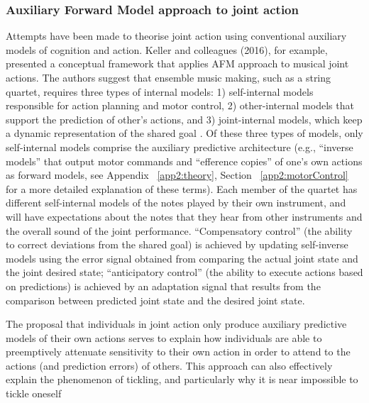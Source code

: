 \begin{CJK}{UTF8}{gbsn}
\subsubsection{Auxiliary Forward Model approach to joint action}
Attempts have been made to theorise joint action using conventional auxiliary models of cognition and action.  Keller and colleagues (2016), for example, presented a conceptual framework that applies AFM approach to musical joint actions.  The authors suggest that ensemble music making, such as a string quartet, requires three types of internal models: 1) self-internal models responsible for action planning and motor control, 2) other-internal models that support the prediction of other’s actions, and 3) joint-internal models, which keep a dynamic representation of the shared goal \citep{Keller2016}.  Of these three types of models, only self-internal models comprise the auxiliary predictive architecture (e.g., ``inverse models'' that output motor commands and ``efference copies'' of one’s own actions as forward models, see Appendix ~\ref{app2:theory}, Section ~\ref{app2:motorControl} for a more detailed explanation of these terms).  Each member of the quartet has different self-internal models of the notes played by their own instrument, and will have expectations about the notes that they hear from other instruments and the overall sound of the joint performance.  ``Compensatory control'' (the ability to correct deviations from the shared goal) is achieved by updating self-inverse models using the error signal obtained from comparing the actual joint state and the joint desired state; ``anticipatory control'' (the ability to execute actions based on predictions) is achieved by an adaptation signal that results from the comparison between predicted joint state and the desired joint state.

The proposal that individuals in joint action only produce auxiliary predictive models of their own actions serves to explain how individuals are able to preemptively attenuate sensitivity to their own action in order to attend to the actions (and prediction errors) of others.  This approach can also effectively explain the phenomenon of tickling, and particularly why it is near impossible to tickle oneself \citep[due to sensory attenuation resulting from the self-generated predictions about the consequences of action][]{Blakemore2003}


\end{CJK}
